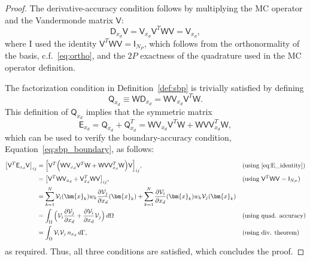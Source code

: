\documentclass[pdflatex,sn-mathphys-num]{sn-jnl}%
\theoremstyle{thmstyleone}%
\theoremstyle{thmstyletwo}%
\theoremstyle{thmstylethree}%
\newcommand{\mat}[1]{\ensuremath{\mathsf{#1}}}
\newcommand{\fnc}[1]{\ensuremath{\mathcal{#1}}}
\begin{document}
\begin{proof}
The derivative-accuracy condition follows by multiplying the MC operator and the Vandermonde matrix $\mat{V}$:
\begin{equation*}
    \mat{D}_{x_d} \mat{V} = \mat{V}_{x_d} \mat{V}^T \mat{W} \mat{V}
     = \mat{V}_{x_d},
\end{equation*}
where I used the identity $\mat{V}^T \mat{W} \mat{V} = \mat{I}_{N_P}$, which follows from the orthonormality of the basis, c.f.~\eqref{eq:ortho}, and the $2P$ exactness of the quadrature used in the MC operator definition.

The factorization condition in Definition~\ref{def:sbp} is trivially satisfied by defining 
\begin{equation}\label{eq:Q_identity}
    \mat{Q}_{x_d} \equiv \mat{W} \mat{D}_{x_d} = \mat{W} \mat{V}_{x_d} \mat{V}^T \mat{W}.
\end{equation}
This definition of $\mat{Q}_{x_d}$ implies that the symmetric matrix 
\begin{equation}\label{eq:E_identity}
    \mat{E}_{x_d} = \mat{Q}_{x_d} + \mat{Q}_{x_d}^T
    = \mat{W} \mat{V}_{x_d} \mat{V}^T \mat{W} + \mat{W} \mat{V} \mat{V}_{x_d}^T \mat{W},
\end{equation}
which can be used to verify the boundary-accuracy condition, Equation~\eqref{eq:sbp_boundary}, as follows:
\begin{alignat*}{2}
\big[ \mat{V}^T \mat{E}_{x_d} \mat{V} \big]_{ij}
&= \Big[ \mat{V}^T \Big( \mat{W} \mat{V}_{x_d} \mat{V}^T \mat{W} + \mat{W} \mat{V} \mat{V}_{x_d}^T \mat{W} \Big) \mat{V} \Big]_{ij},\qquad& &\text{(using \eqref{eq:E_identity})} \\
&= \big[ \mat{V}^T \mat{W} \mat{V}_{x_d} + \mat{V}_{x_d}^T \mat{W} \mat{V} \big]_{ij}, & &\text{(using $\mat{V}^T \mat{W} \mat{V} = \mat{I}_{N_P}$)}\\
&= \sum_{k=1}^{N} \fnc{V}_i(\bm{x}_k) w_k \frac{\partial \fnc{V}_j}{\partial x_d}(\bm{x}_k) + \sum_{k=1}^{N} \frac{\partial \fnc{V}_i}{\partial x_d} (\bm{x}_k) w_k \fnc{V}_j (\bm{x}_k) && \\
&= \int_{\Omega} \Big( \fnc{V}_i \frac{\partial \fnc{V}_j}{\partial x_d} + \frac{\partial \fnc{V}_i}{\partial x_d} \fnc{V}_{j} \Big) \, d\Omega &&\text{(using quad. accuracy)}\\
&= \int_{\Omega} \fnc{V}_i \fnc{V}_j \, n_{x_d}\, d\Gamma, &&\text{(using div. theorem)}
\end{alignat*}
as required.  Thus, all three conditions are satisfied, which concludes the proof.
\end{proof}
\end{document}
